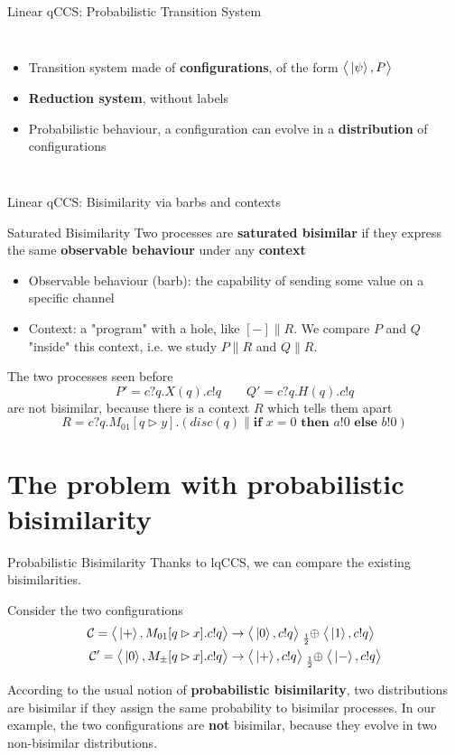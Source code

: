 \documentclass{beamer}
\newcommand{\kp}{\ket{\psi}}
\newcommand{\kz}{\ket{0}}
\newcommand{\ko}{\ket{1}}
\newcommand{\kpl}{\ket{+}}
\newcommand{\km}{\ket{-}}
\newcommand{\psum}[1]{\tensor[_{#1}]{\oplus}{}}
\newcommand{\conf}{\mathcal{C}}
\newcommand{\confw}[1]{\big\langle#1\big\rangle}
\newcommand{\blank}{{-}}
\newcommand{\ite}[3]{\textbf{if } #1 \textbf{ then } #2 \textbf{ else } #3}
\begin{document}
\begin{frame}{Linear qCCS: Probabilistic Transition System}
\begin{columns}
\begin{itemize}
\item Transition system made of \textbf{configurations}, of the form $\confw{\kp, P}$
\item \textbf{Reduction system}, without labels
\item Probabilistic behaviour, a configuration can evolve in a \textbf{distribution} of configurations
\end{itemize}
\pause
{}
\end{columns}
\end{frame}


\begin{frame}{Linear qCCS: Bisimilarity via barbs and contexts}

\begin{block}{Saturated Bisimilarity}
Two processes are \textbf{saturated bisimilar} if they express the same \textbf{observable behaviour} under any \textbf{context} 
\begin{itemize}
\item 
Observable behaviour (barb): the capability of sending some value on a specific channel
\item Context: a "program" with a hole, like $[\blank] \parallel R$. We compare $P$ and $Q$ "inside" this context, i.e. we study $P \parallel R$ and $Q \parallel R$.
\end{itemize}
\end{block}


\pause
The two processes seen before \[
 P' = c?q.X(q).c!q \qquad Q' = c?q.H(q).c!q
\]
are not bisimilar, because there is a context $R$ which tells them apart
\[ R = c?q.M_{01}[q \rhd y].\left( disc(q)\parallel \ite{x = 0}{a!0}{b!0}\right)\]

\end{frame}


\section{The problem with probabilistic bisimilarity}
\begin{frame}{Probabilistic Bisimilarity}
Thanks to lqCCS, we can compare the existing bisimilarities. 

Consider the two configurations 
\begin{align*}
\conf = \confw{\kpl, M_{01}[q \rhd x].c!q} &\rightarrow \confw{\kz, c!q} \psum{\frac{1}{2}} \confw{\ko, c!q} \\
\conf' = \confw{\kz, M_{\pm}[q \rhd x].c!q} &\rightarrow \confw{\kpl, c!q} \psum{\frac{1}{2}} \confw{\km, c!q}
\end{align*}

According to the usual notion of \textbf{probabilistic bisimilarity}, two distributions are bisimilar if they assign the same probability to bisimilar processes. In our example, the two configurations  are \textbf{not} bisimilar, because they evolve in two non-bisimilar distributions.

\end{frame}
\end{document}
